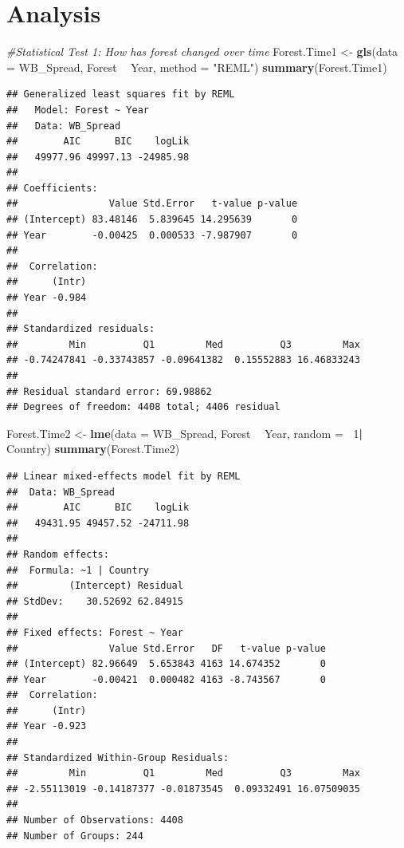 \documentclass[12pt,]{article}
\newenvironment{Shaded}{\begin{snugshade}}{\end{snugshade}}
\newcommand{\KeywordTok}[1]{\textcolor[rgb]{0.13,0.29,0.53}{\textbf{#1}}}
\newcommand{\DataTypeTok}[1]{\textcolor[rgb]{0.13,0.29,0.53}{#1}}
\newcommand{\DecValTok}[1]{\textcolor[rgb]{0.00,0.00,0.81}{#1}}
\newcommand{\StringTok}[1]{\textcolor[rgb]{0.31,0.60,0.02}{#1}}
\newcommand{\CommentTok}[1]{\textcolor[rgb]{0.56,0.35,0.01}{\textit{#1}}}
\newcommand{\OperatorTok}[1]{\textcolor[rgb]{0.81,0.36,0.00}{\textbf{#1}}}
\newcommand{\NormalTok}[1]{#1}
\begin{document}
\newpage

\section{Analysis}\label{analysis}

\begin{Shaded}
\begin{Highlighting}[]
\CommentTok{#Statistical Test 1: How has forest changed over time }
\NormalTok{Forest.Time1 <-}\StringTok{ }\KeywordTok{gls}\NormalTok{(}\DataTypeTok{data =}\NormalTok{ WB_Spread, }
\NormalTok{                    Forest }\OperatorTok{~}\StringTok{ }\NormalTok{Year,}
                    \DataTypeTok{method =} \StringTok{"REML"}\NormalTok{)}
\KeywordTok{summary}\NormalTok{(Forest.Time1)}
\end{Highlighting}
\end{Shaded}

\begin{verbatim}
## Generalized least squares fit by REML
##   Model: Forest ~ Year 
##   Data: WB_Spread 
##        AIC      BIC    logLik
##   49977.96 49997.13 -24985.98
## 
## Coefficients:
##                Value Std.Error   t-value p-value
## (Intercept) 83.48146  5.839645 14.295639       0
## Year        -0.00425  0.000533 -7.987907       0
## 
##  Correlation: 
##      (Intr)
## Year -0.984
## 
## Standardized residuals:
##         Min          Q1         Med          Q3         Max 
## -0.74247841 -0.33743857 -0.09641382  0.15552883 16.46833243 
## 
## Residual standard error: 69.98862 
## Degrees of freedom: 4408 total; 4406 residual
\end{verbatim}

\begin{Shaded}
\begin{Highlighting}[]
\NormalTok{Forest.Time2 <-}\StringTok{ }\KeywordTok{lme}\NormalTok{(}\DataTypeTok{data =}\NormalTok{ WB_Spread,}
\NormalTok{                Forest }\OperatorTok{~}\StringTok{ }\NormalTok{Year,}
                \DataTypeTok{random =} \OperatorTok{~}\DecValTok{1}\OperatorTok{|}\StringTok{ }\NormalTok{Country)}
\KeywordTok{summary}\NormalTok{(Forest.Time2)}
\end{Highlighting}
\end{Shaded}

\begin{verbatim}
## Linear mixed-effects model fit by REML
##  Data: WB_Spread 
##        AIC      BIC    logLik
##   49431.95 49457.52 -24711.98
## 
## Random effects:
##  Formula: ~1 | Country
##         (Intercept) Residual
## StdDev:    30.52692 62.84915
## 
## Fixed effects: Forest ~ Year 
##                Value Std.Error   DF   t-value p-value
## (Intercept) 82.96649  5.653843 4163 14.674352       0
## Year        -0.00421  0.000482 4163 -8.743567       0
##  Correlation: 
##      (Intr)
## Year -0.923
## 
## Standardized Within-Group Residuals:
##         Min          Q1         Med          Q3         Max 
## -2.55113019 -0.14187377 -0.01873545  0.09332491 16.07509035 
## 
## Number of Observations: 4408
## Number of Groups: 244
\end{verbatim}
\end{document}
